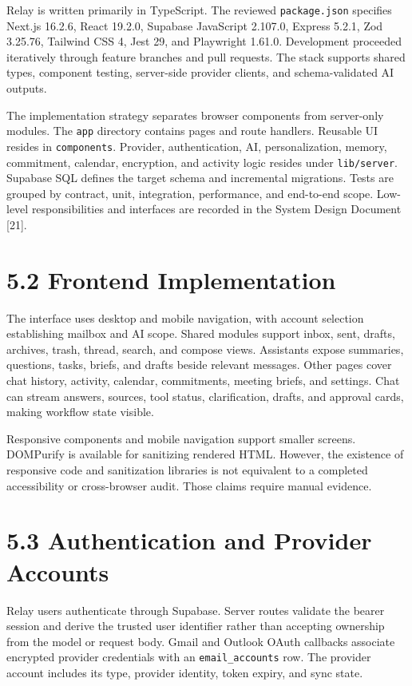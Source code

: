 \documentclass[
]{report}
\begin{document}
Relay is written primarily in TypeScript. The reviewed
\texttt{package.json} specifies Next.js 16.2.6, React 19.2.0, Supabase
JavaScript 2.107.0, Express 5.2.1, Zod 3.25.76, Tailwind CSS 4, Jest 29,
and Playwright 1.61.0. Development proceeded iteratively through feature
branches and pull requests. The stack supports shared types, component
testing, server-side provider clients, and schema-validated AI outputs.

The implementation strategy separates browser components from
server-only modules. The \texttt{app} directory contains pages and route
handlers. Reusable UI resides in \texttt{components}. Provider,
authentication, AI, personalization, memory, commitment, calendar,
encryption, and activity logic resides under \texttt{lib/server}.
Supabase SQL defines the target schema and incremental migrations. Tests
are grouped by contract, unit, integration, performance, and end-to-end
scope. Low-level responsibilities and interfaces are recorded in the
System Design Document {[}21{]}.

\section{5.2 Frontend Implementation}\label{52-frontend-implementation}

The interface uses desktop and mobile navigation, with account selection
establishing mailbox and AI scope. Shared modules support inbox, sent,
drafts, archives, trash, thread, search, and compose views. Assistants
expose summaries, questions, tasks, briefs, and drafts beside relevant
messages. Other pages cover chat history, activity, calendar,
commitments, meeting briefs, and settings. Chat can stream answers,
sources, tool status, clarification, drafts, and approval cards, making
workflow state visible.

Responsive components and mobile navigation support smaller screens.
DOMPurify is available for sanitizing rendered HTML. However, the
existence of responsive code and sanitization libraries is not
equivalent to a completed accessibility or cross-browser audit. Those
claims require manual evidence.

\section{5.3 Authentication and Provider
Accounts}\label{53-authentication-and-provider-accounts}

Relay users authenticate through Supabase. Server routes validate the
bearer session and derive the trusted user identifier rather than
accepting ownership from the model or request body. Gmail and Outlook
OAuth callbacks associate encrypted provider credentials with an
\texttt{email\_accounts} row. The provider account includes its type,
provider identity, token expiry, and sync state.
\end{document}

